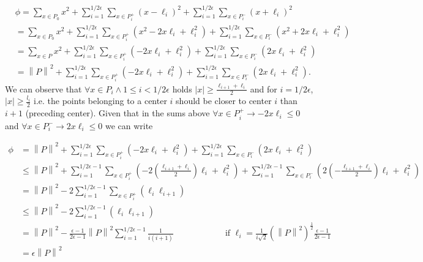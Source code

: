 \documentclass[a4paper]{article}
\newcommand{\norm}[1]{\left\lVert#1\right\rVert}
\begin{document}
\begin{enumerate}
    \begin{align*}
      &\phi =\sum_{x \in P_0} x^2 + \sum_{i = 1}^{1/2\epsilon}\sum_{x \in P_i^+}
      (x - \ell_i)^2 + \sum_{i = 1}^{1/2\epsilon}\sum_{x \in P_i^-} (x + \ell_i)^2 \\
      &=\sum_{x \in P_0} x^2 + \sum_{i = 1}^{1/2\epsilon}\sum_{x \in P_i^+} (x^2
      - 2x\ell_i + \ell_i^2)
      + \sum_{i = 1}^{1/2\epsilon}\sum_{x \in P_i^-} (x^2
      + 2x\ell_i + \ell_i^2)\\
      &=\sum_{x \in P} x^2 + \sum_{i = 1}^{1/2\epsilon}\sum_{x \in P_i^+} (
      - 2x\ell_i + \ell_i^2) + \sum_{i = 1}^{1/2\epsilon}\sum_{x \in P_i^-} (
      2x\ell_i + \ell_i^2)\\
      &=\norm{P}^2 + \sum_{i = 1}^{1/2\epsilon}\sum_{x \in P_i^+} (
      - 2x\ell_i + \ell_i^2) + \sum_{i = 1}^{1/2\epsilon}\sum_{x \in P_i^-} (
      2x\ell_i + \ell_i^2).
    \end{align*}
      We can observe that $\forall x \in P_i \land 1 \le i < 1/2\epsilon $
      holds $|x| \ge \frac{\ell_{i+1} + \ell_i }{2}$ and for $ i = 1/2\epsilon$,
      $|x|
      \ge \frac{l_i}{2}$ i.e. the points belonging to a center $i$ should be
      closer to center $i$ than $i + 1$ (preceding center). Given that in the
      sums above $\forall x \in P_i^+ \rightarrow -2x\ell_i \le 0$ and $\forall x
      \in P_i^- \rightarrow 2x\ell_i \le 0$ we can write

      \begin{align*}
        \phi &= \norm{P}^2 + \sum_{i = 1}^{1/2\epsilon}\sum_{x \in P_i^+} (
        - 2x\ell_i + \ell_i^2) + \sum_{i = 1}^{1/2\epsilon}\sum_{x \in P_i^-} (
        2x\ell_i + \ell_i^2) \\
        &\le \norm{P}^2 + \sum_{i = 1}^{1/2\epsilon - 1}\sum_{x \in P_i^+} (
        - 2 \left( \frac{\ell_{i+1} + \ell_i }{2} \right) \ell_i + \ell_i^2) +
        \sum_{i = 1}^{1/2\epsilon - 1 }\sum_{x \in P_i^-} (
        2 \left( - \frac{\ell_{i+1} + \ell_i }{2} \right) \ell_i + \ell_i^2) \\
        &= \norm{P}^2 - 2\sum_{i = 1}^{1/2\epsilon - 1}\sum_{x \in P_i^+} (\ell_i
        \ell_{i + 1}) \\
        &\le \norm{P}^2 - 2\sum_{i = 1}^{1/2\epsilon - 1} (\ell_i \ell_{i + 1}) \\
        &=\norm{P}^2 - \frac{\epsilon - 1}{2\epsilon - 1}\norm{P}^2 \sum_{i = 1}^{1/2\epsilon - 1} \frac{1}{i (i
        + 1)} \qquad \qquad \qquad \text{if } \ell_i = \frac{1}{i \sqrt2}
        (\norm{P}^2)^{\frac{1}{2}}\frac{\epsilon - 1}{2\epsilon - 1}\\
        &= \epsilon \norm{P}^2
      \end{align*}
\end{enumerate}

    \iffalse
    \begin{figure}[!htbp]
    \begin{center}
    \texttt{[image: house.png]}
    \end{center}
    \caption{\textit{The house subgraph}}\label{house}
    \end{figure}
    \fi
\end{document}
